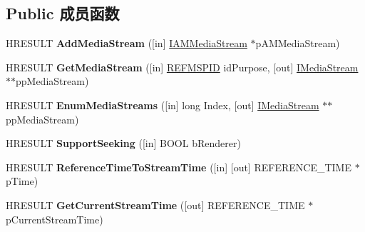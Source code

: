 \subsection*{Public 成员函数}
\begin{DoxyCompactItemize}
\item 
\mbox{\label{interface_i_media_stream_filter_a43a954bd2e116d70dfaaff2613788581}} 
H\+R\+E\+S\+U\+LT {\bfseries Add\+Media\+Stream} (\mbox{[}in\mbox{]} \hyperlink{interface_i_a_m_media_stream}{I\+A\+M\+Media\+Stream} $\ast$p\+A\+M\+Media\+Stream)
\item 
\mbox{\label{interface_i_media_stream_filter_abd569551ec64804f399656ea3066af2e}} 
H\+R\+E\+S\+U\+LT {\bfseries Get\+Media\+Stream} (\mbox{[}in\mbox{]} \hyperlink{struct___g_u_i_d}{R\+E\+F\+M\+S\+P\+ID} id\+Purpose, \mbox{[}out\mbox{]} \hyperlink{interface_i_media_stream}{I\+Media\+Stream} $\ast$$\ast$pp\+Media\+Stream)
\item 
\mbox{\label{interface_i_media_stream_filter_a495898ce96a56b62f9e661294bb3172c}} 
H\+R\+E\+S\+U\+LT {\bfseries Enum\+Media\+Streams} (\mbox{[}in\mbox{]} long Index, \mbox{[}out\mbox{]} \hyperlink{interface_i_media_stream}{I\+Media\+Stream} $\ast$$\ast$pp\+Media\+Stream)
\item 
\mbox{\label{interface_i_media_stream_filter_a86fd6c99b202d61c8336ab2b1321ca5c}} 
H\+R\+E\+S\+U\+LT {\bfseries Support\+Seeking} (\mbox{[}in\mbox{]} B\+O\+OL b\+Renderer)
\item 
\mbox{\label{interface_i_media_stream_filter_a3a61a9c7e5c12e66d9ea9ff9be46064d}} 
H\+R\+E\+S\+U\+LT {\bfseries Reference\+Time\+To\+Stream\+Time} (\mbox{[}in\mbox{]} \mbox{[}out\mbox{]} R\+E\+F\+E\+R\+E\+N\+C\+E\+\_\+\+T\+I\+ME $\ast$p\+Time)
\item 
\mbox{\label{interface_i_media_stream_filter_a239bbd104f6cd8784a570c45d7bfca19}} 
H\+R\+E\+S\+U\+LT {\bfseries Get\+Current\+Stream\+Time} (\mbox{[}out\mbox{]} R\+E\+F\+E\+R\+E\+N\+C\+E\+\_\+\+T\+I\+ME $\ast$p\+Current\+Stream\+Time)
\item 
\mbox{\label{interface_i_media_stream_filter_ae8944ae9bce50fa631aae21f90c646c3}} 

\end{DoxyCompactItemize}
